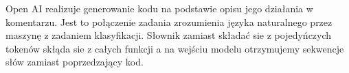 Open AI realizuje generowanie kodu na podstawie opisu jego działania w komentarzu. Jest to połączenie zadania zrozumienia 
języka naturalnego przez maszynę z zadaniem klasyfikacji. Słownik zamiast składać sie z pojedyńczych tokenów skłąda sie z całych funkcji 
a na wejściu modelu otrzymujemy sekwencje słów zamiast poprzedzający kod. 
